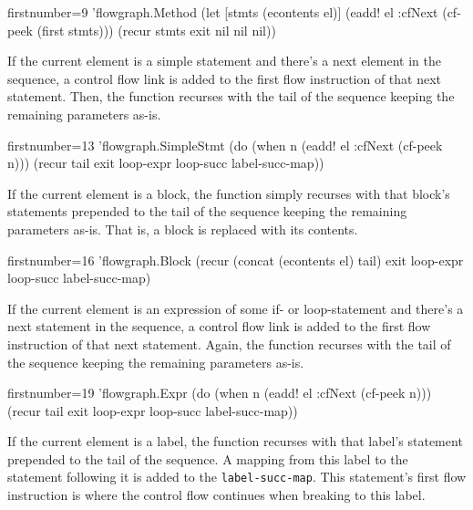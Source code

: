 \documentclass[11pt]{article}
\begin{document}
\begin{clojurecode*}{firstnumber=9}
        'flowgraph.Method
                   (let [stmts (econtents el)]
                     (eadd! el :cfNext (cf-peek (first stmts)))
                     (recur stmts exit nil nil nil))
\end{clojurecode*}

If the current element is a simple statement and there's a next element in the
sequence, a control flow link is added to the first flow instruction of that
next statement.  Then, the function recurses with the tail of the sequence
keeping the remaining parameters as-is.

\begin{clojurecode*}{firstnumber=13}
        'flowgraph.SimpleStmt
                   (do (when n (eadd! el :cfNext (cf-peek n)))
                       (recur tail exit loop-expr loop-succ label-succ-map))
\end{clojurecode*}

If the current element is a block, the function simply recurses with that
block's statements prepended to the tail of the sequence keeping the remaining
parameters as-is.  That is, a block is replaced with its contents.

\begin{clojurecode*}{firstnumber=16}
        'flowgraph.Block
                   (recur (concat (econtents el) tail)
                          exit loop-expr loop-succ label-succ-map)
\end{clojurecode*}

If the current element is an expression of some if- or loop-statement and
there's a next statement in the sequence, a control flow link is added to the
first flow instruction of that next statement.  Again, the function recurses
with the tail of the sequence keeping the remaining parameters as-is.

\begin{clojurecode*}{firstnumber=19}
        'flowgraph.Expr
                   (do (when n (eadd! el :cfNext (cf-peek n)))
                       (recur tail exit loop-expr loop-succ label-succ-map))
\end{clojurecode*}

If the current element is a label, the function recurses with that label's
statement prepended to the tail of the sequence.  A mapping from this label to
the statement following it is added to the \verb|label-succ-map|.  This
statement's first flow instruction is where the control flow continues when
breaking to this label.
\end{document}
